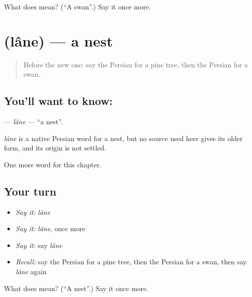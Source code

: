 \begin{tcolorbox}[breakable,colback=teal!4,colframe=teal!35!black,title={Before you move on}]
What does  mean? (\textquotedblleft{}A swan\textquotedblright{}.) Say it once more.
\end{tcolorbox}
\section[\texorpdfstring{\fa{لانه} (lâne)}{لانه (lâne)}]{ (lâne) — a nest}

\label{lesson:FA-C245-lane}



\begin{quote}
Before the new one: say the Persian for a pine tree, then the Persian for a swan.
\end{quote}

\subsection*{You'll want to know: }
\textbf{} — \emph{lâne} — \textquotedblleft{}a nest\textquotedblright{}.

\begin{cousinweb}
\emph{lâne} is a native Persian word for a nest, but no source used here gives its older form, and its origin is not settled.
\end{cousinweb}

\begin{grammarlens}[title={What you've built}]
One more word for this chapter.
\end{grammarlens}

\subsection*{Your turn}
\begin{itemize}
\raggedright
  \item \emph{Say it:} \emph{lâne}
  \item \emph{Say it:} \emph{lâne}, once more
  \item \emph{Say it:} say \emph{lâne}
  \item \emph{Recall:} say the Persian for a pine tree, then the Persian for a swan, then say \emph{lâne} again
\end{itemize}

\begin{tcolorbox}[breakable,colback=teal!4,colframe=teal!35!black,title={Before you move on}]
What does  mean? (\textquotedblleft{}A nest\textquotedblright{}.) Say it once more.
\end{tcolorbox}

